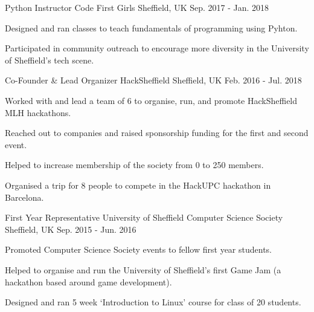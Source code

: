 

\begin{cventries}

  \cventry
    {Python Instructor} %
    {Code First Girls} %
    {Sheffield, UK} %
    {Sep. 2017 - Jan. 2018} %
    {
      \begin{cvitems} %
        \item {Designed and ran classes to teach fundamentals of programming using Pyhton.}
        \item {Participated in community outreach to encourage more diversity in the University of Sheffield's tech scene.}
      \end{cvitems}
    }

  \cventry
    {Co-Founder \& Lead Organizer} %
    {HackSheffield} %
    {Sheffield, UK} %
    {Feb. 2016 - Jul. 2018} %
    {
      \begin{cvitems} %
      \item{Worked with and lead a team of 6 to organise, run, and promote HackSheffield MLH hackathons.}
      \item{Reached out to companies and raised sponsorship funding for the first and second event.}
      \item{Helped to increase membership of the society from 0 to 250 members.}
      \item{Organised a trip for 8 people to compete in the HackUPC hackathon in Barcelona.}
      \end{cvitems}
    }

  \cventry
    {First Year Representative} %
    {University of Sheffield Computer Science Society} %
    {Sheffield, UK} %
    {Sep. 2015 - Jun. 2016} %
    {
      \begin{cvitems} %
      \item{Promoted Computer Science Society events to fellow first year students.}
      \item{Helped to organise and run the University of Sheffield’s first Game Jam (a hackathon based around game development).}
      \item{Designed and ran 5 week ‘Introduction to Linux’ course for class of 20 students.}
      \end{cvitems}
    }

\end{cventries}
